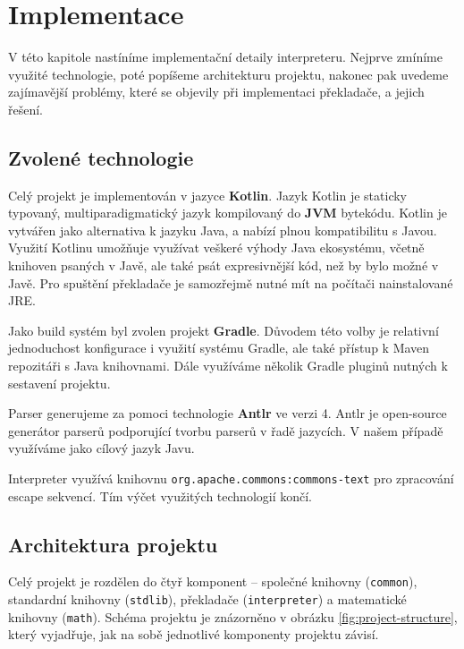 \chapter{Implementace}

V této kapitole nastíníme implementační detaily interpreteru. Nejprve zmíníme
využité technologie, poté popíšeme architekturu projektu, nakonec pak uvedeme
zajímavější problémy, které se objevily při implementaci překladače, a jejich
řešení.

\section{Zvolené technologie}

Celý projekt je implementován v jazyce \textbf{Kotlin}. Jazyk Kotlin je staticky
typovaný, multiparadigmatický jazyk kompilovaný do \textbf{JVM} bytekódu.
Kotlin je vytvářen jako alternativa k jazyku Java, a nabízí plnou kompatibilitu
s Javou. Využití Kotlinu umožňuje využívat veškeré výhody Java ekosystému,
včetně knihoven psaných v Javě, ale také psát expresivnější kód, než by bylo
možné v Javě. Pro spuštění překladače je samozřejmě nutné mít na počítači
nainstalované JRE.

Jako build systém byl zvolen projekt \textbf{Gradle}. Důvodem této volby je
relativní jednoduchost konfigurace i využití systému Gradle, ale také přístup
k Maven repozitáři s Java knihovnami. Dále využíváme několik Gradle pluginů
nutných k sestavení projektu.

Parser generujeme za pomoci technologie \textbf{Antlr} ve verzi 4. Antlr je
open-source generátor parserů podporující tvorbu parserů v řadě jazycích.
V našem případě využíváme jako cílový jazyk Javu.

Interpreter využívá knihovnu \lstinline{org.apache.commons:commons-text}
pro zpracování escape sekvencí. Tím výčet využitých technologií končí.

\section{Architektura projektu}

Celý projekt je rozdělen do čtyř komponent -- společné knihovny
(\lstinline{common}), standardní knihovny (\lstinline{stdlib}), překladače
(\lstinline{interpreter}) a matematické knihovny (\lstinline{math}). Schéma
projektu je znázorněno v obrázku \ref{fig:project-structure}, který vyjadřuje,
jak na sobě jednotlivé komponenty projektu závisí.


